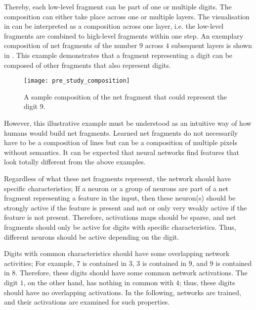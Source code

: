 Thereby, each low-level fragment can be part of one or multiple digits.
The composition can either take place across one or multiple layers.
The visualisation in  can be interpreted as a composition across one layer, i.e. the low-level fragments are combined to high-level fragments within one step.
An exemplary composition of net fragments of the number $9$ across $4$ subsequent layers is shown in .
This example demonstrates that a fragment representing a digit can be composed of other fragments that also represent digits.


\begin{figure}[h]
    \centering
    \texttt{[image: pre\_study\_composition]}
    \caption[Sample Net Fragment Composition]{A sample composition of the net fragment that could represent the digit $9$.}
\end{figure}

However, this illustrative example must be understood as an intuitive way of how humans would build net fragments.
Learned net fragments do not necessarily have to be a composition of lines but can be a composition of multiple pixels without semantics.
It can be expected that neural networks find features that look totally different from the above examples.

Regardless of what these net fragments represent, the network should have specific characteristics;
If a neuron or a group of neurons are part of a net fragment representing a feature in the input, then these neuron(s) should be strongly active if the feature is present and not or only very weakly active if the feature is not present.
Therefore, activations maps should be sparse, and net fragments should only be active for digits with specific characteristics.
Thus, different neurons should be active depending on the digit.

Digits with common characteristics should have some overlapping network activities;
For example, $7$ is contained in $3$, $3$ is contained in $9$, and $9$ is contained in $8$.
Therefore, these digits should have some common network activations.
The digit $1$, on the other hand, has nothing in common with $4$; thus, these digits should have no overlapping activations.
In the following, networks are trained, and their activations are examined for such properties.

